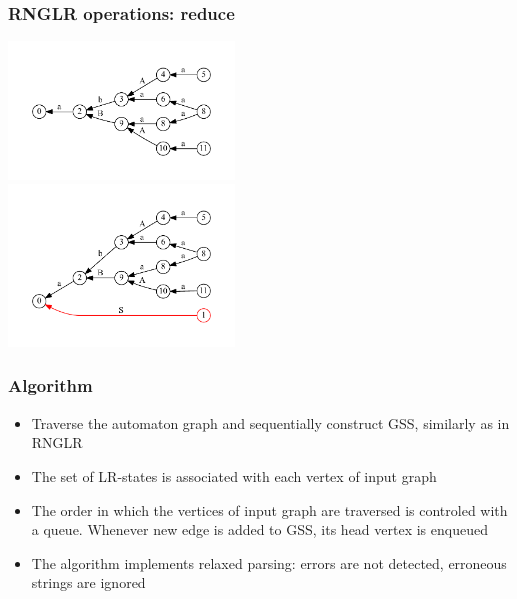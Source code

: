 \documentclass{beamer}
\begin{document}
\begin{frame}
  \transwipe[direction=90]
  \frametitle{RNGLR operations: reduce}
  \begin{center}
  \includegraphics[width=6cm]{pictures/gss_rnglr_reduce_1} \\
  \includegraphics[width=6cm]{pictures/gss_rnglr_reduce_2}
  \end{center}
\end{frame}

\begin{frame}
  \transwipe[direction=90]
  \frametitle{Algorithm}
  \begin{itemize}
    \item Traverse the automaton graph and sequentially construct GSS, similarly as in RNGLR
    \item The set of LR-states is associated with each vertex of input graph
    \item The order in which the vertices of input graph are traversed is 
controled with a queue. Whenever new edge is added to GSS, its head vertex is enqueued
  \end{itemize}
  \begin{itemize}
    \item The algorithm implements relaxed parsing: errors are not detected, 
erroneous strings are ignored
  \end{itemize}

\end{frame}
\end{document}

